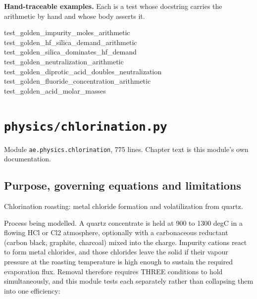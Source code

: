 \documentclass[10pt,a4paper,twoside]{report}
\begin{document}
\normalsize

\textbf{Hand-traceable examples.} Each is a test whose docstring carries the arithmetic by hand and whose body asserts it.

\begin{verbatimsmall}
test_golden_impurity_moles_arithmetic
test_golden_hf_silica_demand_arithmetic
test_golden_silica_dominates_hf_demand
test_golden_neutralization_arithmetic
test_golden_diprotic_acid_doubles_neutralization
test_golden_fluoride_concentration_arithmetic
test_golden_acid_molar_masses
\end{verbatimsmall}

\clearpage

\chapter{\texttt{physics/chlorination.py}}\label{ch:chlorination}


{\footnotesize\color{slate}Module \texttt{ae.physics.chlorination}, 775 lines. Chapter text is this module's own documentation.\par}

\section{Purpose, governing equations and limitations}

Chlorination roasting: metal chloride formation and volatilization from quartz.

Process being modelled. A quartz concentrate is held at 900 to 1300 degC in a flowing HCl or Cl2 atmosphere, optionally with a carbonaceous reductant (carbon black, graphite, charcoal) mixed into the charge. Impurity cations react to form metal chlorides, and those chlorides leave the solid if their vapour pressure at the roasting temperature is high enough to sustain the required evaporation flux. Removal therefore requires THREE conditions to hold simultaneously, and this module tests each separately rather than collapsing them into one efficiency:
\end{document}
